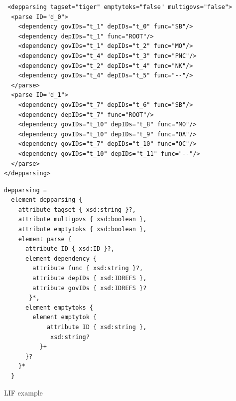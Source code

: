 \documentclass[11pt]{article}
\newenvironment{example}
    {\begin{tcolorbox}\small}
    {\end{tcolorbox}}
\begin{document}
\begin{example}
\begin{verbatim}
 <depparsing tagset="tiger" emptytoks="false" multigovs="false">
  <parse ID="d_0">
    <dependency govIDs="t_1" depIDs="t_0" func="SB"/>
    <dependency depIDs="t_1" func="ROOT"/>
    <dependency govIDs="t_1" depIDs="t_2" func="MO"/>
    <dependency govIDs="t_4" depIDs="t_3" func="PNC"/>
    <dependency govIDs="t_2" depIDs="t_4" func="NK"/>
    <dependency govIDs="t_4" depIDs="t_5" func="--"/>
  </parse>
  <parse ID="d_1">
    <dependency govIDs="t_7" depIDs="t_6" func="SB"/>
    <dependency depIDs="t_7" func="ROOT"/>
    <dependency govIDs="t_10" depIDs="t_8" func="MO"/>
    <dependency govIDs="t_10" depIDs="t_9" func="OA"/>
    <dependency govIDs="t_7" depIDs="t_10" func="OC"/>
    <dependency govIDs="t_10" depIDs="t_11" func="--"/>
  </parse>
</depparsing>
\end{verbatim}
\end{example}

\begin{example}
\begin{verbatim}
depparsing =
  element depparsing {
    attribute tagset { xsd:string }?,
    attribute multigovs { xsd:boolean },
    attribute emptytoks { xsd:boolean },
    element parse {
      attribute ID { xsd:ID }?,
      element dependency {
        attribute func { xsd:string }?,
        attribute depIDs { xsd:IDREFS },
        attribute govIDs { xsd:IDREFS }?
       }*,
      element emptytoks {
        element emptytok {
            attribute ID { xsd:string },
             xsd:string?
          }+
      }?
    }*
  }
\end{verbatim}
\end{example}

\newpage
LIF example
\end{document}
